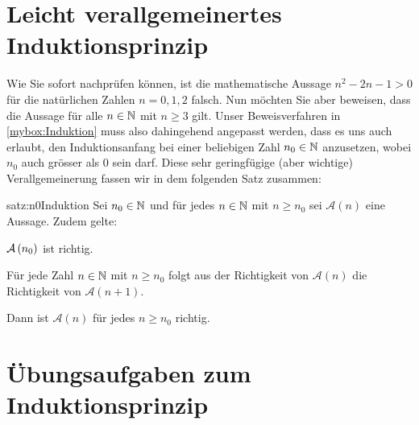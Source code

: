 \section{Leicht verallgemeinertes Induktionsprinzip}
Wie Sie sofort nachprüfen können, ist die mathematische Aussage $n^2 - 2n - 1 > 0$ für die natürlichen Zahlen $n = 0, 1, 2$ falsch. Nun möchten Sie aber beweisen, dass die Aussage für alle $n\in\mathbb{N}$ mit $n\geq 3$ gilt. Unser Beweisverfahren in \cref{mybox:Induktion} muss also dahingehend angepasst werden, dass es uns auch erlaubt, den Induktionsanfang bei einer beliebigen Zahl $n_0\in\mathbb{N}$ anzusetzen, wobei $n_0$ auch grösser als $0$ sein darf. Diese sehr geringfügige (aber wichtige) Verallgemeinerung fassen wir in dem folgenden Satz zusammen:
\begin{satz}{satz:n0Induktion}
Sei $n_0\in\mathbb{N}$ und für jedes $n\in\mathbb{N}$ mit $n\geq n_0$ sei $\mathcal{A}(n)$ eine Aussage. Zudem gelte:
\begin{renum}
    \item $\mathcal{A}\left(n_0\right)$ ist richtig.
    \item Für jede Zahl $n\in\mathbb{N}$ mit $n\geq n_0$ folgt aus der Richtigkeit von $\mathcal{A}(n)$ die Richtigkeit von $\mathcal{A}(n+1)$.
\end{renum}
Dann ist $\mathcal{A}(n)$ für jedes $n\geq n_0$ richtig.
\end{satz}


\section{Übungsaufgaben zum Induktionsprinzip}

